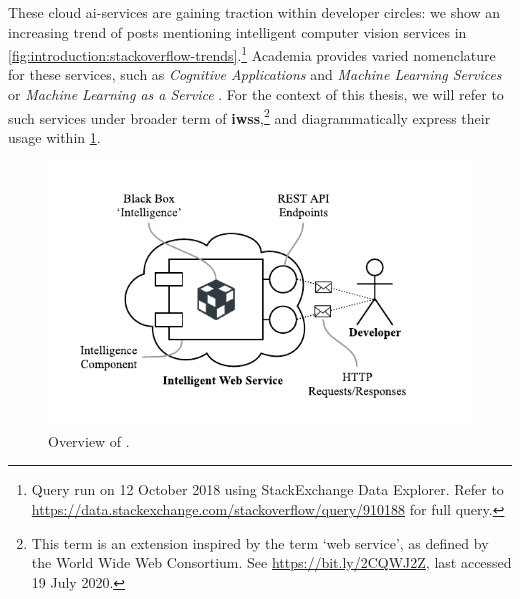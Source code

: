 These cloud \gls{ai}-services are gaining traction within developer circles: we show an increasing trend of  posts mentioning intelligent computer vision services in \cref{fig:introduction:stackoverflow-trends}.\footnote{Query run on 12 October 2018 using StackExchange Data Explorer. Refer to \url{https://data.stackexchange.com/stackoverflow/query/910188} for full query.}
Academia provides varied nomenclature for these services, such as \textit{Cognitive Applications} and \textit{Machine Learning Services} \citep{Hwang:2017tr} or \textit{Machine Learning as a Service} \citep{Ribeiro:2015dz}. 
For the context of this thesis, we will refer to such services under broader term of \textbf{\glspl{iws}},\footnote{This term is an extension inspired by the term `web service', as defined by the World Wide Web Consortium. See \url{https://bit.ly/2CQWJ2Z}, last accessed 19 July 2020.} and diagrammatically express their usage within \cref{fig:introduction:cloud-intelliegnce-service}.

\begin{figure}[h!]
\centering
\includegraphics[width=0.9\linewidth]{cloud-intelliegnce-service}
\caption[Overview of intelligent web services]{Overview of .}
\label{fig:introduction:cloud-intelliegnce-service}
\end{figure}

